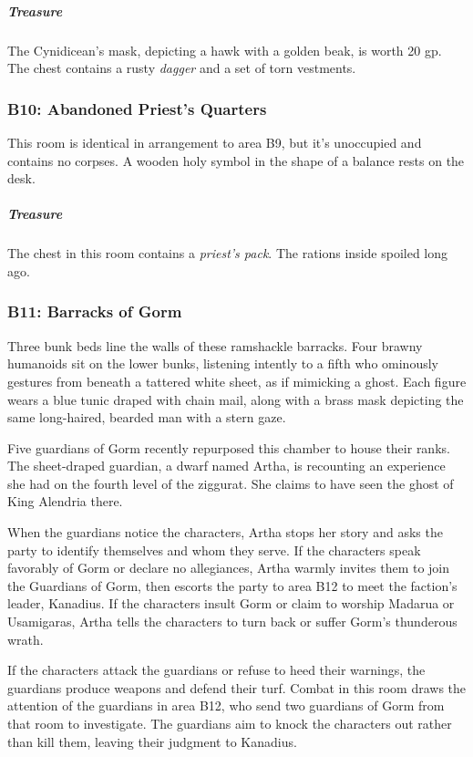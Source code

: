 \documentclass[10pt,a4paper,twoside,bg=print,twocolumn,openany,nodeprecatedcode]{dndbook}
\begin{document}
\subparagraph{Treasure}
The Cynidicean's mask, depicting a hawk with a golden beak, is worth 20 gp. The chest contains a rusty \textit{dagger} and a set of torn vestments.

\subsubsection{B10: Abandoned Priest's Quarters}
This room is identical in arrangement to area B9, but it's unoccupied and contains no corpses. A wooden holy symbol in the shape of a balance rests on the desk.

\subparagraph{Treasure}
The chest in this room contains a \textit{priest's pack}. The rations inside spoiled long ago.

\subsubsection{B11: Barracks of Gorm}
\begin{DndReadAloud}{}
Three bunk beds line the walls of these ramshackle barracks. Four brawny humanoids sit on the lower bunks, listening intently to a fifth who ominously gestures from beneath a tattered white sheet, as if mimicking a ghost. Each figure wears a blue tunic draped with chain mail, along with a brass mask depicting the same long-haired, bearded man with a stern gaze.

\end{DndReadAloud}

Five guardians of Gorm recently repurposed this chamber to house their ranks. The sheet-draped guardian, a dwarf named Artha, is recounting an experience she had on the fourth level of the ziggurat. She claims to have seen the ghost of King Alendria there.

When the guardians notice the characters, Artha stops her story and asks the party to identify themselves and whom they serve. If the characters speak favorably of Gorm or declare no allegiances, Artha warmly invites them to join the Guardians of Gorm, then escorts the party to area B12 to meet the faction's leader, Kanadius. If the characters insult Gorm or claim to worship Madarua or Usamigaras, Artha tells the characters to turn back or suffer Gorm's thunderous wrath.

If the characters attack the guardians or refuse to heed their warnings, the guardians produce weapons and defend their turf. Combat in this room draws the attention of the guardians in area B12, who send two guardians of Gorm from that room to investigate. The guardians aim to knock the characters out rather than kill them, leaving their judgment to Kanadius.
\end{document}
